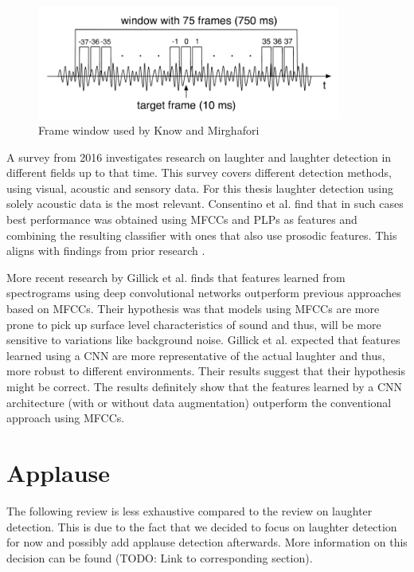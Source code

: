 \documentclass[bsc,frontabs,parskip,deptreport]{infthesis}
\begin{document}
\begin{figure}[htp]
    \centering
    \includegraphics[width=10cm]{imgs/Knox_window.png}
    \caption{Frame window used by Know and Mirghafori}
    \label{fig:know_window}
\end{figure}

A survey from 2016 \cite{cosentino2016quantitative} investigates research on laughter and laughter detection in different fields up to that time.
This survey covers different detection methods, using visual, acoustic and sensory data.
For this thesis laughter detection using solely acoustic data is the most relevant. Consentino et al. \cite{cosentino2016quantitative} find that in such cases best performance was obtained using MFCCs and PLPs as features and combining the resulting classifier with ones that also use prosodic features.
This aligns with findings from prior research \cite{truong2007automatic, knox2006automatic}.

More recent research by Gillick et al. \cite{gillick2021robust} finds that features learned from spectrograms using deep convolutional networks outperform previous approaches based on MFCCs.
Their hypothesis was that models using MFCCs are more prone to pick up surface level characteristics of sound and thus, will be more sensitive to variations like background noise.
Gillick et al. expected that features learned using a CNN are more representative of the actual laughter and thus, more robust to different environments. 
Their results suggest that their hypothesis might be correct.
The results definitely show that the features learned by a CNN architecture (with or without data augmentation) outperform the conventional approach using MFCCs. 


\section{Applause}
The following review is less exhaustive compared to the review on laughter detection.
This is due to the fact that we decided to focus on laughter detection for now and possibly add applause detection afterwards.
More information on this decision can be found (TODO: Link to corresponding section).
\end{document}
